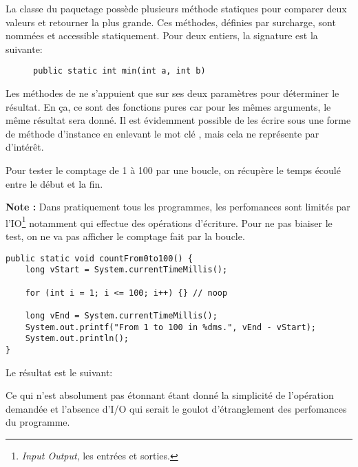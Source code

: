 \begin{exercise}[subtitle=maximum]

La classe  du paquetage  possède plusieurs méthode statiques pour comparer deux valeurs et retourner la plus grande. Ces méthodes, définies par surcharge, sont nommées  et accessible statiquement. Pour deux entiers, la signature est la suivante:

\begin{figure}[h]
  \centering
  \texttt{public static int min(int a, int b)}
\end{figure}

\end{exercise}

\begin{exercise}[subtitle=static]

Les méthodes  de  ne s'appuient que sur ses deux paramètres pour déterminer le résultat. En ça, ce sont des fonctions pures car pour les mêmes arguments, le même résultat sera donné. Il est évidemment possible de les écrire sous une forme de méthode d'instance en enlevant le mot clé , mais cela ne représente par d'intérêt.

\end{exercise}

\begin{exercise}[subtitle=currentTimeMillis]

Pour tester le comptage de 1 à 100 par une boucle, on récupère le temps écoulé entre le début et la fin.

\textbf{Note :} Dans pratiquement tous les programmes, les perfomances sont limités par l'IO\footnote{\textit{Input Output}, les entrées et sorties.} notamment  qui effectue des opérations d'écriture. Pour ne pas biaiser le test, on ne va pas afficher le comptage fait par la boucle.

\begin{verbatim}
public static void countFrom0to100() {
    long vStart = System.currentTimeMillis();

    for (int i = 1; i <= 100; i++) {} // noop

    long vEnd = System.currentTimeMillis();
    System.out.printf("From 1 to 100 in %dms.", vEnd - vStart);
    System.out.println();
}
\end{verbatim}

Le résultat est le suivant:


Ce qui n'est absolument pas étonnant étant donné la simplicité de l'opération demandée et l'absence d'I/O qui serait le goulot d'étranglement des perfomances du programme.

\end{exercise}

